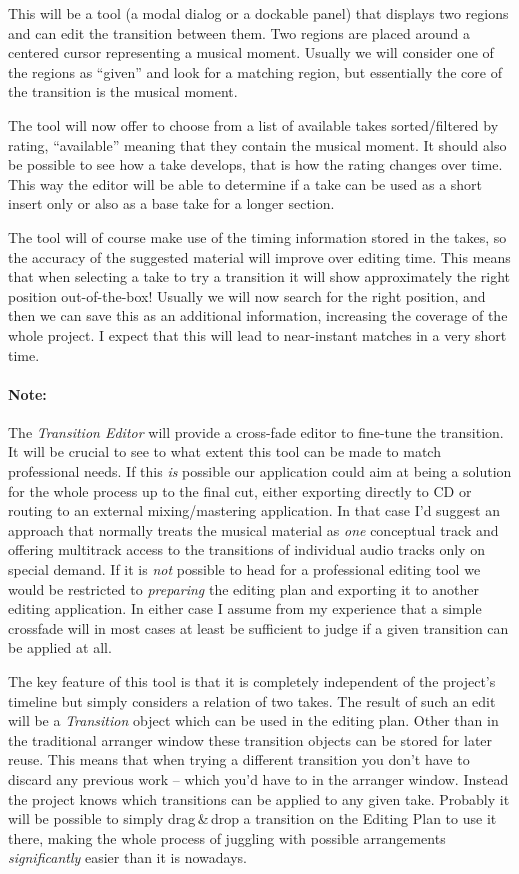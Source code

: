 \documentclass[11pt,a4paper]{article}
\begin{document}
This will be a tool (a modal dialog or a dockable panel) that displays two regions and can edit the transition between them.
Two regions are placed around a centered cursor representing a musical moment.
Usually we will consider one of the regions as “given” and look for a matching region, but essentially the core of the transition is the musical moment.

The tool will now offer to choose from a list of available takes sorted/filtered by rating, “available” meaning that they contain the musical moment.
It should also be possible to see how a take develops, that is how the rating changes over time.
This way the editor will be able to determine if a take can be used as a short insert only or also as a base take for a longer section.

The tool will of course make use of the timing information stored in the takes, so the accuracy of the suggested material will improve over editing time.
This means that when selecting a take to try a transition it will show approximately the right position out-of-the-box!
Usually we will now search for the right position, and then we can save this as an additional information, increasing the coverage of the whole project.
I expect that this will lead to near-instant matches in a very short time.

\paragraph{Note:}
The \emph{Transition Editor} will provide a cross-fade editor to fine-tune the transition.
It will be crucial to see to what extent this tool can be made to match professional needs.
If this \emph{is} possible our application could aim at being a solution for the whole process up to the final cut, either exporting directly to CD or routing to an external mixing/mastering application.
In that case I'd suggest an approach that normally treats the musical material as \emph{one} conceptual track and offering multitrack access to the transitions of individual audio tracks only on special demand.
If it is \emph{not} possible to head for a professional editing tool we would be restricted to \emph{preparing} the editing plan and exporting it to another editing application.
In either case I assume from my experience that a simple crossfade will in most cases at least be sufficient to judge if a given transition can be applied at all.

\medskip
The key feature of this tool is that it is completely independent of the project's timeline but simply considers a relation of two takes.
The result of such an edit will be a \emph{Transition} object which can be used in the editing plan.
Other than in the traditional arranger window these transition objects can be stored for later reuse.
This means that when trying a different transition you don't have to discard any previous work -- which you'd have to in the arranger window.
Instead the project knows which transitions can be applied to any given take.
Probably it will be possible to simply drag\,\&\,drop a transition on the Editing Plan to use it there, making the whole process of juggling with possible arrangements \emph{significantly} easier than it is nowadays.
\end{document}
